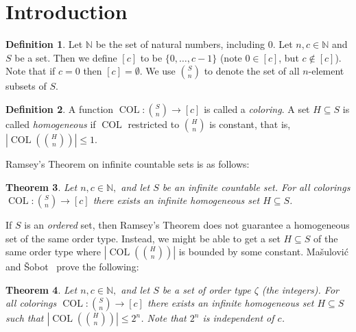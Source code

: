 \documentclass[11pt]{article}
\newcommand{\COL}{\operatorname{COL}}
\newcommand{\N}{\mathbb{N}}
\newcommand{\numpoints}{n}
\newcommand{\numcolors}{c}
\theoremstyle{plain}
\newtheorem{theorem}{Theorem}[section]
\theoremstyle{definition}
\newtheorem{definition}[theorem]{Definition}
\begin{document}
\section{Introduction}


\begin{definition}
Let $\N$ be the set of natural numbers, including 0. 
Let $\numpoints,\numcolors \in \N$ and $S$ be a set. Then we define $[\numcolors]$ to be $ \{ 0, \ldots, \numcolors-1\}$
(note $0 \in [\numcolors]$, but $\numcolors \not \in [\numcolors]$). Note that if $\numcolors=0$ then $[\numcolors] = \emptyset$. 
We use $\binom{S}{\numpoints}$ to denote the set of all $\numpoints$-element subsets of $S$. 
\end{definition}
\begin{definition}
    A function $\COL\colon \binom{S}{\numpoints} \to [\numcolors]$ is called a \textit{coloring}.
    A set $H\subseteq S$ is called \textit{homogeneous} if $\COL$ restricted to 
    $\binom{H}{\numpoints}$ is constant,
    that is, $\left|\COL\left(\binom{H}{\numpoints}\right)\right|\le 1$.
\end{definition}

Ramsey's Theorem on infinite countable sets \cite{Ramsey-1930} is as follows:
\begin{theorem} 
Let $\numpoints,\numcolors\in\N,$ and let $S$ be an infinite countable set.  
For all colorings $\COL\colon \binom{S}{\numpoints}\to [\numcolors]$ 
there exists an infinite homogeneous set $H\subseteq S$. 
\end{theorem} 

If $S$ is an \textit{ordered} set, then Ramsey's Theorem does not guarantee a
homogeneous set of the same order type. Instead, we might be able to get a set $H\subseteq S$ of the same order type where $\left|\COL\left(\binom{H}{\numpoints}\right)\right|$ is bounded by some constant. Ma\v{s}ulovi\'{c} and \v{S}obot~\cite{MS-2021} prove the following:

\begin{theorem} 
Let $\numpoints,\numcolors\in\N,$ and let $S$ be a set
of order type $\zeta$ (the integers).
For all colorings $\COL\colon \binom{S}{\numpoints}\to [\numcolors]$ 
there exists an infinite homogeneous set $H\subseteq S$ such that 
$\left|\COL\left(\binom{H}{\numpoints}\right)\right|\le 2^n$. Note that $2^n$ is independent of 
$\numcolors$. 
\end{theorem} 
\end{document}
